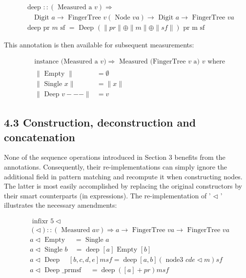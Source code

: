 \documentclass[10pt]{article}
\begin{document}
$$
\begin{aligned}
& \text { deep }::(\text { Measured a } v) \Rightarrow \\
& \quad \text { Digit } a \rightarrow \text { FingerTree } v(\text { Node } v a) \rightarrow \text { Digit } a \rightarrow \text { FingerTree } v a \\
& \text { deep pr } m \text { sf }=\text { Deep }(\|p r\| \oplus\|m\| \oplus\|s f\|) \text { pr m sf }
\end{aligned}
$$

This annotation is then available for subsequent measurements:

$$
\begin{aligned}
& \text { instance (Measured a } v) \Rightarrow \text { Measured (FingerTree } v \text { a) } v \text { where } \\
& \begin{aligned}
\| \text { Empty } \| & =\emptyset \\
\| \text { Single } x \| & =\|x\| \\
\| \text { Deep } v---\| & =v
\end{aligned}
\end{aligned}
$$

\subsection*{4.3 Construction, deconstruction and concatenation}
None of the sequence operations introduced in Section 3 benefits from the annotations. Consequently, their re-implementations can simply ignore the additional field in pattern matching and recompute it when constructing nodes. The latter is most easily accomplished by replacing the original constructors by their smart counterparts (in expressions). The re-implementation of ' $\triangleleft$ ' illustrates the necessary amendments:

$$
\begin{aligned}
& \text { infixr } 5 \triangleleft \\
& (\triangleleft)::(\text { Measured } a v) \Rightarrow a \rightarrow \text { FingerTree } v a \rightarrow \text { FingerTree } v a \\
& a \triangleleft \text { Empty } \quad=\text { Single } a \\
& a \triangleleft \text { Single } b \quad=\text { deep }[a] \text { Empty }[b] \\
& a \triangleleft \text { Deep } \quad[b, c, d, e] m s f=\operatorname{deep}[a, b](\text { node3 } c d e \triangleleft m) s f \\
& a \triangleleft \text { Deep _prmsf } \quad=\operatorname{deep}([a]+p r) m s f
\end{aligned}
$$
\end{document}
